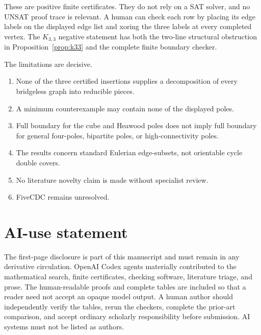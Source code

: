 \documentclass[11pt]{article}
\theoremstyle{definition}
\theoremstyle{remark}
\begin{document}
These are positive finite certificates.  They do not rely on a SAT solver,
and no UNSAT proof trace is relevant.  A human can check each row by
placing its edge labels on the displayed edge list and xoring the three
labels at every completed vertex.  The \(K_{3,3}\) negative statement has
both the two-line structural obstruction in Proposition~\ref{prop:k33}
and the complete finite boundary checker.

The limitations are decisive.
\begin{enumerate}
\item None of the three certified insertions supplies a decomposition of every
      bridgeless graph into reducible pieces.
\item A minimum counterexample may contain none of the displayed poles.
\item Full boundary for the cube and Heawood poles does not imply full boundary for
      general four-poles, bipartite poles, or high-connectivity poles.
\item The results concern standard Eulerian edge-subsets, not orientable
      cycle double covers.
\item No literature novelty claim is made without specialist review.
\item FiveCDC remains unresolved.
\end{enumerate}

\section*{AI-use statement}

The first-page disclosure is part of this manuscript and must remain in
any derivative circulation.  OpenAI Codex agents materially contributed
to the mathematical search, finite certificates, checking software,
literature triage, and prose.  The human-readable proofs and complete
tables are included so that a reader need not accept an opaque model
output.  A human author should independently verify the tables, rerun the
checkers, complete the prior-art comparison, and accept ordinary scholarly
responsibility before submission.  AI systems must not be listed as
authors.



\end{document}
